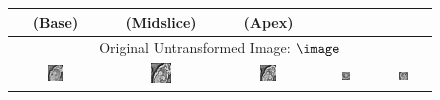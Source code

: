 \renewcommand{\captiontitle}{Representative segmentation results in healthy control subjects}
\begin{figure}
\begin{center}

\setlength{\tabcolsep}{1pt}

\begin{tabular}{ccccc}

\toprule
\SA{} (Base) & \SA{} (Midslice) & \SA{} (Apex) & \HLA{} & \VLA{} \\
\midrule

\multicolumn{5}{c}{Original Untransformed Image: $\image$} \\

\includegraphics[width=0.19\textwidth]{./data/representative-results/control/HCMNet_2600035/00_SAX/BASE/0.png} &
\includegraphics[width=0.19\textwidth]{./data/representative-results/control/HCMNet_2600035/00_SAX/MID/0.png} &
\includegraphics[width=0.19\textwidth]{./data/representative-results/control/HCMNet_2600035/00_SAX/APEX/0.png} &
\includegraphics[width=0.19\textwidth]{./data/representative-results/control/HCMNet_1700012/01_HLA/00/0.png} &
\includegraphics[width=0.19\textwidth]{./data/representative-results/control/HCMNet_1700012/02_VLA/00/0.png} \\


\end{tabular}
\end{center}
\end{figure}
